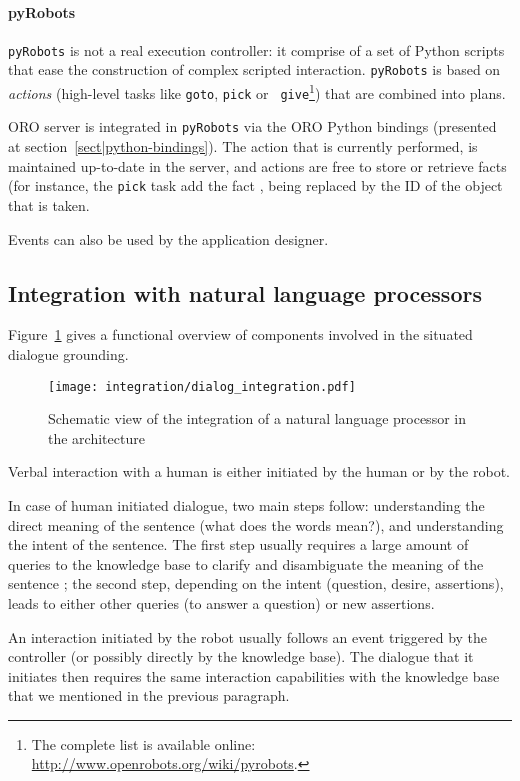 \paragraph{pyRobots} \label{sect|pyrobots} {\tt pyRobots} is not a real
execution controller: it comprise of a set of Python scripts that ease the
construction of complex scripted interaction. {\tt pyRobots} is based on
\emph{actions} (high-level tasks like {\tt goto}, {\tt pick} or {\tt
give}\footnote{The complete list is available online:
\url{http://www.openrobots.org/wiki/pyrobots}.}) that are combined into plans.

ORO server is integrated in {\tt pyRobots} via the ORO Python bindings
(presented at section~\ref{sect|python-bindings}). The action that is currently
performed, is maintained up-to-date in the server, and actions are free to
store or retrieve facts (for instance, the {\tt pick} task add the fact
,  being replaced by the ID of
the object that is taken.

Events can also be used by the application designer.


\subsection{Integration with natural language processors}

Figure~\ref{fig|dialog-integration} gives a functional overview of
components involved in the situated dialogue grounding.

\begin{figure}
    \centering
    \texttt{[image: integration/dialog\_integration.pdf]}
    \caption{Schematic view of the integration of a natural language processor
    in the architecture}
    \label{fig|dialog-integration}
\end{figure}

Verbal interaction with a human is either initiated by the human or by the robot.

In case of human initiated dialogue, two main steps follow: understanding the
direct meaning of the sentence (what does the words mean?), and understanding
the intent of the sentence. The first step usually requires a large amount of
queries to the knowledge base to clarify and disambiguate the meaning of the
sentence ; the second step, depending on the intent (question, desire,
assertions), leads to either other queries (to answer a question) or new
assertions.

An interaction initiated by the robot usually follows an event triggered by the
controller (or possibly directly by the knowledge base). The dialogue that it
initiates then requires the same interaction capabilities with the knowledge
base that we mentioned in the previous paragraph.

